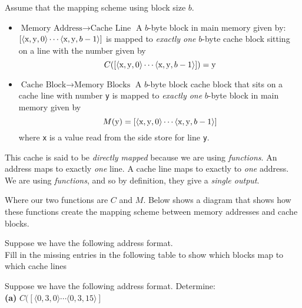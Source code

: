 Assume that the mapping scheme using block size $b$. 
\begin{itemize}	
\renewcommand{\labelitemi}{$\Box$}
\item \textbf{$\text{Memory Address} \rightarrow \text{Cache Line}$} 
A $b$-byte block in main memory given by:
$ [\langle \text{\lstinline{x}}, \text{\lstinline{y}}, 0 \rangle
\dotsm \langle \text{\lstinline{x}}, \text{\lstinline{y}}, b-1 \rangle]$
is mapped to \textit{exactly one} $b$-byte cache block sitting on a line with the 
number given by
$$C([\langle \text{\lstinline{x}}, \text{\lstinline{y}}, 0 \rangle
\dotsm \langle \text{\lstinline{x}}, \text{\lstinline{y}}, b-1 \rangle])
= \text{\lstinline{y}}$$

\item \textbf{$\text{Cache Block} \rightarrow \text{Memory Blocks}$} 
A $b$-byte block cache block that sits on a cache line with number \lstinline{y}
is mapped to \textit{exactly one} $b$-byte block in main memory given by 
$$M(\text{\lstinline{y}}) = [
\langle \text{\lstinline{x}}, \text{\lstinline{y}}, 0 \rangle
\dotsm
\langle \text{\lstinline{x}}, \text{\lstinline{y}}, b-1 \rangle]$$
where \lstinline{x} is a value read from the side store for line \lstinline{y}.
\end{itemize}

This cache is said to be \textit{directly mapped} because we are using 
\textit{functions}. An address maps to exactly \textit{one} line. 
A cache line maps to exactly to \textit{one} address.
We are using \textit{functions}, and so by definition, 
they give a \textit{single output}.


Where our two functions are $C$ and $M$.
Below shows a diagram that shows how these functions create the 
mapping scheme between memory addresses and cache blocks. 


\frmrule

\begin{example}
Suppose we have the following address format. \\
Fill in the missing entries in  the following table to show which blocks map to which cache lines
\end{example}

\begin{example}
Suppose we have the following address format. Determine: \\
\textbf{(a)} $C([\langle 0, 3, 0 \rangle \dotsm \langle 0, 3, 15 \rangle]$
\end{example}

